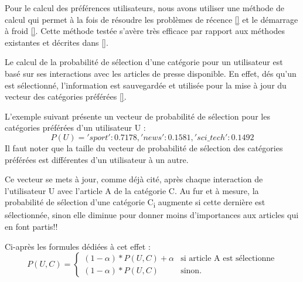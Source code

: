         Pour le calcul des préférences utilisateurs, nous avons utiliser une méthode de calcul qui permet à la fois de résoudre les problèmes de récence \autoref{} et le démarrage à froid \autoref{}. Cette méthode testée s'avère très efficace par rapport aux méthodes existantes et décrites dans \autoref{}.

        Le calcul de la probabilité de sélection d'une catégorie pour un utilisateur est basé sur ses interactions avec les articles de presse disponible. En effet, dés qu'un est sélectionné, l'information est sauvegardée et utilisée pour la mise à jour du vecteur des catégories préférées \autoref{}.

        L'exemple suivant présente un vecteur de probabilité de sélection pour les catégories préférées d'un utilisateur U :
            \[P(U) = {'sport': 0.7178, 'news': 0.1581, 'sci\_tech': 0.1492}\]            
        Il faut noter que la taille du vecteur de probabilité de sélection des catégories préférées est différentes d'un utilisateur à un autre.

        Ce vecteur se mets à jour, comme déjà cité, après chaque interaction de l'utilisateur U avec l'article A de la catégorie C. Au fur et à mesure, la probabilité de sélection d'une catégorie C\textsubscript{i} augmente si cette dernière est sélectionnée, sinon elle diminue pour donner moins d'importances aux articles qui en font partis!!

        Ci-après les formules dédiées à cet effet :\\
            \[
            P(U, C) =
            \begin{cases}
                (1-{\alpha}) * {P(U, C)} + {\alpha} & \text{si } \text{article A est sélectionne} \\
                (1-{\alpha}) * {P(U, C)} & \text{sinon.}
            \end{cases}
            \]

